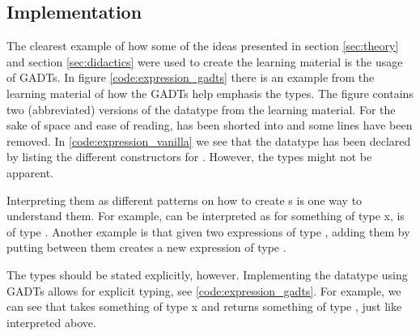 \subsection{Implementation}
The clearest example of how some of the ideas presented in section \ref{sec:theory} and section \ref{sec:didactics} were used to create the learning material is the usage of \gls{GADTs}. In figure \ref{code:expression_gadts} there is an example from the learning material of how the \gls{GADTs} help emphasis the types. %
The figure contains two (abbreviated) versions of the  datatype from the learning material. For the sake of space and ease of reading,  has been shorted into  and some lines have been removed.
In \ref{code:expression_vanilla} we see that the datatype has been declared by listing the different constructors for . 
However, the types might not be apparent. 
\begin{modtext}
Interpreting them as different patterns on how to create s is one way to understand them. For example,  can be interpreted as for something of type x,  is of type . Another example is that given two expressions of type , adding them by putting \cmd{:+:} between them creates a new expression of type . 
\end{modtext}
The types should be stated explicitly, however. Implementing the datatype using \gls{GADTs} allows for explicit typing, see \ref{code:expression_gadts}.
For example, we can see that  takes something of type x and returns something of type , just like interpreted above. 

